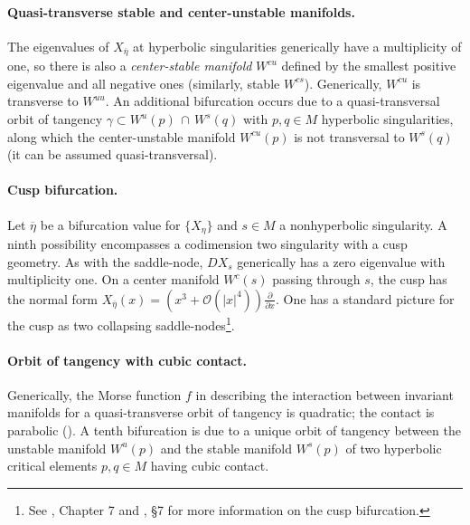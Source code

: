 \documentclass[12pt]{article}
\begin{document}
\paragraph{Quasi-transverse stable and center-unstable manifolds.}
The eigenvalues of $X_{\overline{\eta}}$ at hyperbolic singularities generically have a multiplicity of one, so there is also a \textit{center-stable manifold} $W^{cu}$ defined by the smallest positive eigenvalue and all negative ones (similarly, stable $W^{cs}$). Generically, $W^{cu}$ is transverse to $W^{uu}$. An additional bifurcation occurs due to a quasi-transversal orbit of tangency $\gamma \subset W^u(p) \, \cap \, W^s(q)$ with $p,q \in M$ hyperbolic singularities, along which the center-unstable manifold $W^{cu}(p)$ is not transversal to $W^s(q)$ (it can be assumed quasi-transversal).


\paragraph{Cusp bifurcation.}
Let $\overline{\eta}$ be a bifurcation value for $\{X_{\eta}\}$ and $s \in M$ a nonhyperbolic singularity. A ninth possibility encompasses a codimension two singularity with a cusp geometry. As with the saddle-node, $DX_s$ generically has a zero eigenvalue with multiplicity one. On a center manifold $W^c(s)$ passing through $s$, the cusp has the normal form ${X_{\overline{\eta}}(x) = \left( x^3 + \mathcal{O}\left( |x|^4 \right) \right)\frac{\partial}{\partial x}}$. One has a standard picture for the cusp as two collapsing saddle-nodes\footnote{See \cite{guckenheimer2013nonlinear}, Chapter 7 and \cite{dias1989bifurcations}, \S7 for more information on the cusp bifurcation.}.



\paragraph{Orbit of tangency with cubic contact.}
Generically, the Morse function $f$ in  describing the interaction between invariant manifolds for a quasi-transverse orbit of tangency is quadratic; the contact is parabolic (\cite{palis1983stability}). A tenth bifurcation is due to a unique orbit of tangency between the unstable manifold $W^u(p)$ and the stable manifold $W^s(p)$ of two hyperbolic critical elements $p,q \in M$ having cubic contact.
\end{document}
